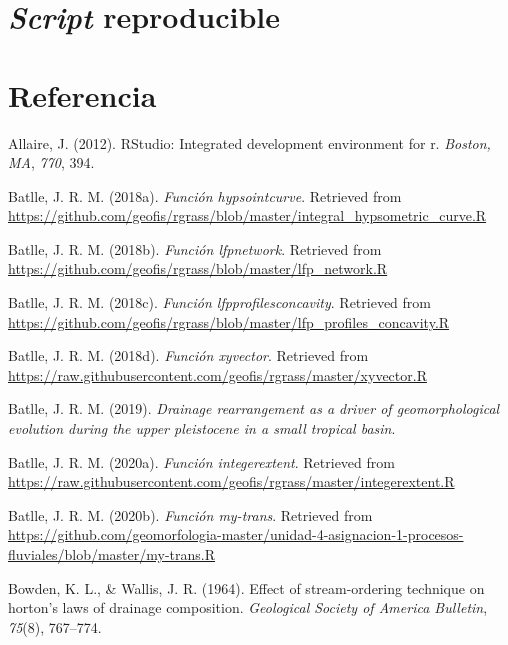 \documentclass[11pt,]{article}
\begin{document}
\section{\texorpdfstring{\emph{Script}
reproducible}{Script reproducible}}\label{script-reproducible}

\section*{Referencia}\label{referencia}

\hypertarget{refs}{}
\hypertarget{ref-allaire2012rstudio}{}
Allaire, J. (2012). RStudio: Integrated development environment for r.
\emph{Boston, MA}, \emph{770}, 394.

\hypertarget{ref-Hypsocjose}{}
Batlle, J. R. M. (2018a). \emph{Función hypsointcurve}. Retrieved from
\url{https://github.com/geofis/rgrass/blob/master/integral_hypsometric_curve.R}

\hypertarget{ref-lfpnetjose}{}
Batlle, J. R. M. (2018b). \emph{Función lfpnetwork}. Retrieved from
\url{https://github.com/geofis/rgrass/blob/master/lfp_network.R}

\hypertarget{ref-lfpconcajose}{}
Batlle, J. R. M. (2018c). \emph{Función lfpprofilesconcavity}. Retrieved
from
\url{https://github.com/geofis/rgrass/blob/master/lfp_profiles_concavity.R}

\hypertarget{ref-xyvector}{}
Batlle, J. R. M. (2018d). \emph{Función xyvector}. Retrieved from
\url{https://raw.githubusercontent.com/geofis/rgrass/master/xyvector.R}

\hypertarget{ref-batlle2019drainage}{}
Batlle, J. R. M. (2019). \emph{Drainage rearrangement as a driver of
geomorphological evolution during the upper pleistocene in a small
tropical basin}.

\hypertarget{ref-intext}{}
Batlle, J. R. M. (2020a). \emph{Función integerextent}. Retrieved from
\url{https://raw.githubusercontent.com/geofis/rgrass/master/integerextent.R}

\hypertarget{ref-Mytransjose}{}
Batlle, J. R. M. (2020b). \emph{Función my-trans}. Retrieved from
\url{https://github.com/geomorfologia-master/unidad-4-asignacion-1-procesos-fluviales/blob/master/my-trans.R}

\hypertarget{ref-bowden1964effect}{}
Bowden, K. L., \& Wallis, J. R. (1964). Effect of stream-ordering
technique on horton's laws of drainage composition. \emph{Geological
Society of America Bulletin}, \emph{75}(8), 767--774.
\end{document}
